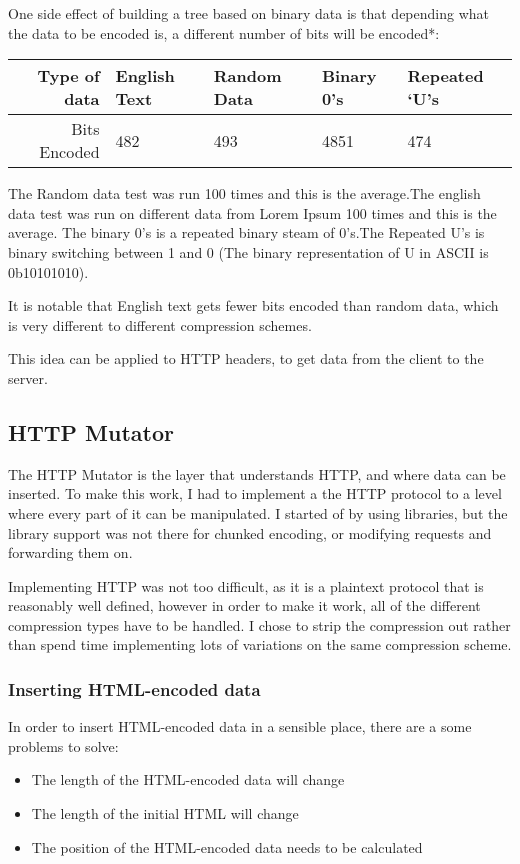 \newpage
One side effect of building a tree based on binary data is that depending what the data to be encoded is, a different number of bits will be encoded*:

\begin{table}[ht]
\begin{tabular}{@{}rllll@{}}
\toprule
Type of data & English Text & Random Data & Binary 0's & Repeated `U's \\ \midrule
Bits Encoded & 482 & 493 & 4851 & 474 \\ \bottomrule
\end{tabular}
\end{table}
{\tiny * The Random data test was run 100 times and this is the average.The english data test was run on different data from Lorem Ipsum 100 times and this is the average. The binary 0's is a repeated binary steam of 0's.The Repeated U's is binary switching between 1 and 0 (The binary representation of U in ASCII is 0b10101010).}\par
\vspace{0.5cm}
It is notable that English text gets fewer bits encoded than random data, which is very different to different compression schemes.\par
\vspace{0.5cm}
This idea can be applied to HTTP headers, to get data from the client to the server.

\subsection{HTTP Mutator}
The HTTP Mutator is the layer that understands HTTP, and where data can be inserted.
To make this work, I had to implement a the HTTP protocol to a level where every part of it can be manipulated. I started of by using libraries, but the library support was not there for chunked encoding, or modifying requests and forwarding them on.\par
Implementing HTTP was not too difficult, as it is a plaintext protocol that is reasonably well defined, however in order to make it work, all of the different compression types have to be handled. I chose to strip the compression out rather than spend time implementing lots of variations on the same compression scheme.\par

\subsubsection{Inserting HTML-encoded data}
In order to insert HTML-encoded data in a sensible place, there are a some problems to solve:
\begin{itemize}
    \item The length of the HTML-encoded data will change
    \item The length of the initial HTML will change
    \item The position of the HTML-encoded data needs to be calculated
\end{itemize}

